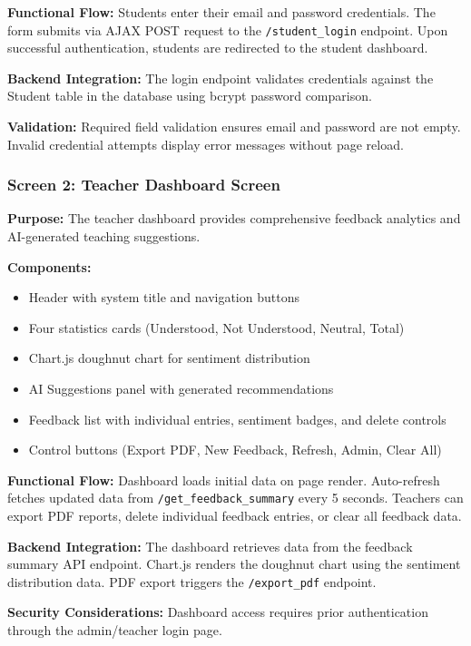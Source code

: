 \textbf{Functional Flow:}
Students enter their email and password credentials. The form submits via AJAX POST request to the \texttt{/student\_login} endpoint. Upon successful authentication, students are redirected to the student dashboard.

\textbf{Backend Integration:}
The login endpoint validates credentials against the Student table in the database using bcrypt password comparison.

\textbf{Validation:}
Required field validation ensures email and password are not empty. Invalid credential attempts display error messages without page reload.


\subsubsection{Screen 2: Teacher Dashboard Screen}

\textbf{Purpose:}  
The teacher dashboard provides comprehensive feedback analytics and AI-generated teaching suggestions.

\textbf{Components:}
\begin{itemize}
    \item Header with system title and navigation buttons
    \item Four statistics cards (Understood, Not Understood, Neutral, Total)
    \item Chart.js doughnut chart for sentiment distribution
    \item AI Suggestions panel with generated recommendations
    \item Feedback list with individual entries, sentiment badges, and delete controls
    \item Control buttons (Export PDF, New Feedback, Refresh, Admin, Clear All)
\end{itemize}

\textbf{Functional Flow:}
Dashboard loads initial data on page render. Auto-refresh fetches updated data from \texttt{/get\_feedback\_summary} every 5 seconds. Teachers can export PDF reports, delete individual feedback entries, or clear all feedback data.

\textbf{Backend Integration:}
The dashboard retrieves data from the feedback summary API endpoint. Chart.js renders the doughnut chart using the sentiment distribution data. PDF export triggers the \texttt{/export\_pdf} endpoint.

\textbf{Security Considerations:}
Dashboard access requires prior authentication through the admin/teacher login page.

